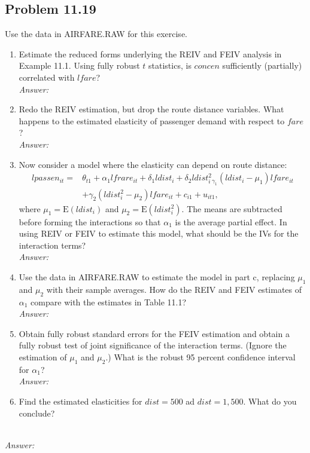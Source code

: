 \documentclass[10pt]{article}
\newcommand{\E}{\text{E}}
\begin{document}
\subsection*{Problem 11.19}
Use the data in AIRFARE.RAW for this exercise.
\begin{enumerate}[label=\alph*.]
\item Estimate the reduced forms underlying the REIV and FEIV analysis in Example 11.1. Using fully robust $t$ statistics, is $concen$ sufficiently (partially) correlated with $lfare$?
\\ \textit{Answer:}\\

\item Redo the REIV estimation, but drop the route distance variables. What happens to the estimated elasticity of passenger demand with respect to $fare$?
\\ \textit{Answer:}\\

\item Now consider a model where the elasticity can depend on route distance:
\begin{align*}
    lpassen_{it}=&\theta_{t1}+\alpha_1 lfrare_{it}+\delta_1 ldist_i+\delta_2 ldist_i^2_\gamma_1(ldist_i-\mu_1)lfare_{it}\\
    &+\gamma_2(ldist_i^2-\mu_2)lfare_{it}+c_{i1}+u_{it1},
\end{align*}
where $\mu_1=\E(ldist_i)$ and $\mu_2=\E(ldist_i^2)$. The means are subtracted before forming the interactions so that $\alpha_1$ is the average partial effect. In using REIV or FEIV to estimate this model, what should be the IVs for the interaction terms?
\\ \textit{Answer:}\\

\item Use the data in AIRFARE.RAW to estimate the model in part c, replacing $\mu_1$ and $\mu_2$ with their sample averages. How do the REIV and FEIV estimates of $\alpha_1$ compare with the estimates in Table 11.1?
\\ \textit{Answer:}\\

\item Obtain fully robust standard errors for the FEIV estimation and obtain a fully robust test of joint significance of the interaction terms. (Ignore the estimation of $\mu_1$ and $\mu_2$.) What is the robust 95 percent confidence interval for $\alpha_1$?
\\ \textit{Answer:}\\

\item Find the estimated elasticities for $dist=500$ ad $dist=1,500.$ What do you conclude?
\end{enumerate}
\\ \textit{Answer:}\\
\end{document}
